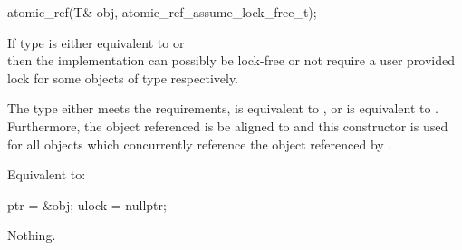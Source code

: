 \begin{addedblock}
\begin{itemdecl}
atomic_ref(T& obj, atomic_ref_assume_lock_free_t);
\end{itemdecl}

\begin{itemdescr}
\pnum
\mandates If type  is either equivalent to  
or \\  then the implementation can possibly be
lock-free or not require a user provided lock for some objects of type  
respectively.

\pnum
\expects The type  either meets the  requirements, 
 is equivalent to , or
 is equivalent to .
\\ Furthermore, the object referenced  is be aligned to  and
this constructor is used for all  objects which concurrently reference the 
object referenced by .

\pnum
\effects Equivalent to:
\begin{codeblock}
  ptr = &obj;
  ulock = nullptr;
\end{codeblock}

\pnum
\throws Nothing.
\end{itemdescr}

\end{addedblock}


